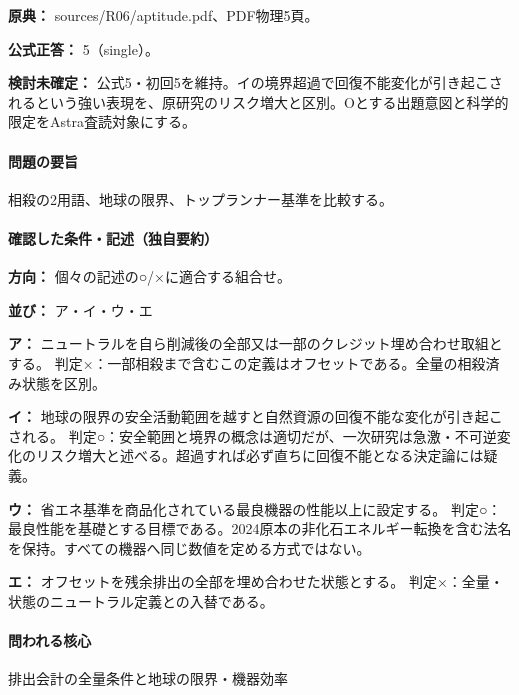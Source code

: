 \noindent\textbf{原典：} sources/R06/aptitude.pdf、PDF物理5頁。

\textbf{公式正答：} 5（single）。

\par\textbf{検討未確定：} 公式5・初回5を維持。イの境界超過で回復不能変化が引き起こされるという強い表現を、原研究のリスク増大と区別。Oとする出題意図と科学的限定をAstra査読対象にする。

\paragraph{問題の要旨} 相殺の2用語、地球の限界、トップランナー基準を比較する。

\paragraph{確認した条件・記述（独自要約）}\mbox{}\par

\noindent\textbf{方向：} 個々の記述の○/×に適合する組合せ。\par

\noindent\textbf{並び：} ア・イ・ウ・エ\par

\noindent\textbf{ア：} ニュートラルを自ら削減後の全部又は一部のクレジット埋め合わせ取組とする。 判定×：一部相殺まで含むこの定義はオフセットである。全量の相殺済み状態を区別。\par

\noindent\textbf{イ：} 地球の限界の安全活動範囲を越すと自然資源の回復不能な変化が引き起こされる。 判定○：安全範囲と境界の概念は適切だが、一次研究は急激・不可逆変化のリスク増大と述べる。超過すれば必ず直ちに回復不能となる決定論には疑義。\par

\noindent\textbf{ウ：} 省エネ基準を商品化されている最良機器の性能以上に設定する。 判定○：最良性能を基礎とする目標である。2024原本の非化石エネルギー転換を含む法名を保持。すべての機器へ同じ数値を定める方式ではない。\par

\noindent\textbf{エ：} オフセットを残余排出の全部を埋め合わせた状態とする。 判定×：全量・状態のニュートラル定義との入替である。\par

\paragraph{問われる核心} 排出会計の全量条件と地球の限界・機器効率

